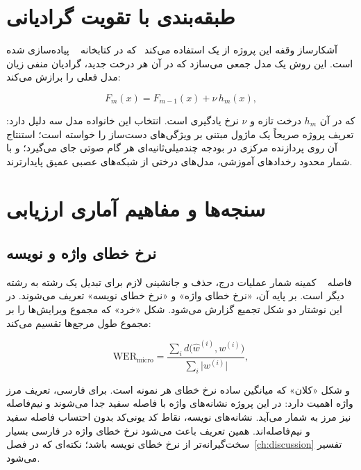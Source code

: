 \section{طبقه‌بندی با تقویت گرادیانی}
\label{sec:gbdt}

آشکارساز وقفه این پروژه از یک  استفاده
می‌کند~\cite{friedman2001gbm} که در کتابخانه
~\cite{pedregosa2011sklearn} پیاده‌سازی شده است. این روش یک
مدل جمعی می‌سازد که در آن هر درخت جدید، گرادیان منفی زیان مدل فعلی را
برازش می‌کند:

\begin{equation}
F_m(x) = F_{m-1}(x) + \nu \, h_m(x),
\label{eq:gbm}
\end{equation}

که در آن $h_m$ درخت تازه و $\nu$ نرخ یادگیری است. انتخاب این خانواده مدل
سه دلیل دارد: تعریف پروژه صریحاً یک ماژول مبتنی بر ویژگی‌های دست‌ساز را
خواسته است؛ استنتاج آن روی پردازنده مرکزی در بودجه چند‌میلی‌ثانیه‌ای هر گام
صوتی جای می‌گیرد؛ و با شمار محدود رخدادهای آموزشی، مدل‌های درختی از
شبکه‌های عصبی عمیق پایدارترند.

\section{سنجه‌ها و مفاهیم آماری ارزیابی}
\label{sec:metrics-prelim}

\subsection{نرخ خطای واژه و نویسه}

فاصله ~\cite{levenshtein1966} کمینه شمار عملیات درج، حذف و
جانشینی لازم برای تبدیل یک رشته به رشته دیگر است. بر پایه آن،
«نرخ خطای واژه» و «نرخ خطای نویسه» تعریف می‌شوند. در این نوشتار
دو شکل تجمیع گزارش می‌شود. شکل «خرد» که مجموع ویرایش‌ها را بر مجموع
طول مرجع‌ها تقسیم می‌کند:

\begin{equation}
\mathrm{WER}_{\text{micro}} =
\frac{\sum_{i} d\bigl(\hat{w}^{(i)}, w^{(i)}\bigr)}{\sum_{i} \bigl|w^{(i)}\bigr|},
\label{eq:wer}
\end{equation}

و شکل «کلان» که میانگین ساده نرخ خطای هر نمونه است. برای فارسی، تعریف
مرز واژه اهمیت دارد: در این پروژه نشانه‌های واژه با فاصله سفید جدا می‌شوند
و نیم‌فاصله نیز مرز به شمار می‌آید. نشانه‌های نویسه، نقاط کد یونی‌کد بدون
احتساب فاصله سفید و نیم‌فاصله‌اند. همین تعریف باعث می‌شود نرخ خطای واژه در
فارسی بسیار سخت‌گیرانه‌تر از نرخ خطای نویسه باشد؛ نکته‌ای که در
فصل~\ref{ch:discussion} تفسیر می‌شود.

